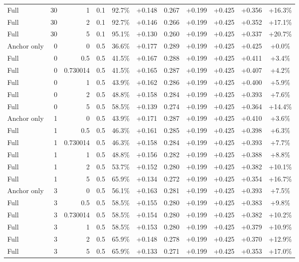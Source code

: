 \begin{table}[htbp]
\begin{tabular}{lrrrccccccc}
Full & 30 & 1 & 0.1 & 92.7\% & +0.148 & 0.267 & +0.199 & +0.425 & +0.356 & +16.3\% \\
Full & 30 & 2 & 0.1 & 92.7\% & +0.146 & 0.266 & +0.199 & +0.425 & +0.352 & +17.1\% \\
Full & 30 & 5 & 0.1 & 95.1\% & +0.130 & 0.260 & +0.199 & +0.425 & +0.337 & +20.7\% \\
Anchor only & 0 & 0 & 0.5 & 36.6\% & +0.177 & 0.289 & +0.199 & +0.425 & +0.425 & +0.0\% \\
Full & 0 & 0.5 & 0.5 & 41.5\% & +0.167 & 0.288 & +0.199 & +0.425 & +0.411 & +3.4\% \\
Full & 0 & 0.730014 & 0.5 & 41.5\% & +0.165 & 0.287 & +0.199 & +0.425 & +0.407 & +4.2\% \\
Full & 0 & 1 & 0.5 & 43.9\% & +0.162 & 0.286 & +0.199 & +0.425 & +0.400 & +5.9\% \\
Full & 0 & 2 & 0.5 & 48.8\% & +0.158 & 0.284 & +0.199 & +0.425 & +0.393 & +7.6\% \\
Full & 0 & 5 & 0.5 & 58.5\% & +0.139 & 0.274 & +0.199 & +0.425 & +0.364 & +14.4\% \\
Anchor only & 1 & 0 & 0.5 & 43.9\% & +0.171 & 0.287 & +0.199 & +0.425 & +0.410 & +3.6\% \\
Full & 1 & 0.5 & 0.5 & 46.3\% & +0.161 & 0.285 & +0.199 & +0.425 & +0.398 & +6.3\% \\
Full & 1 & 0.730014 & 0.5 & 46.3\% & +0.158 & 0.284 & +0.199 & +0.425 & +0.393 & +7.7\% \\
Full & 1 & 1 & 0.5 & 48.8\% & +0.156 & 0.282 & +0.199 & +0.425 & +0.388 & +8.8\% \\
Full & 1 & 2 & 0.5 & 53.7\% & +0.152 & 0.280 & +0.199 & +0.425 & +0.382 & +10.1\% \\
Full & 1 & 5 & 0.5 & 65.9\% & +0.134 & 0.272 & +0.199 & +0.425 & +0.354 & +16.7\% \\
Anchor only & 3 & 0 & 0.5 & 56.1\% & +0.163 & 0.281 & +0.199 & +0.425 & +0.393 & +7.5\% \\
Full & 3 & 0.5 & 0.5 & 58.5\% & +0.155 & 0.280 & +0.199 & +0.425 & +0.383 & +9.8\% \\
Full & 3 & 0.730014 & 0.5 & 58.5\% & +0.154 & 0.280 & +0.199 & +0.425 & +0.382 & +10.2\% \\
Full & 3 & 1 & 0.5 & 58.5\% & +0.153 & 0.280 & +0.199 & +0.425 & +0.379 & +10.9\% \\
Full & 3 & 2 & 0.5 & 65.9\% & +0.148 & 0.278 & +0.199 & +0.425 & +0.370 & +12.9\% \\
Full & 3 & 5 & 0.5 & 65.9\% & +0.133 & 0.271 & +0.199 & +0.425 & +0.353 & +17.0\% \\

\end{tabular}
\end{table}
